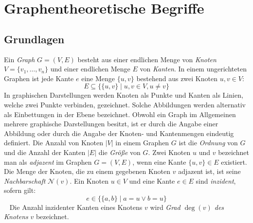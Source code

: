\section{Graphentheoretische Begriffe}
\vspace{-1mm}
\label{chap_prel}
\subsection{Grundlagen}
Ein \emph{Graph} $G = (V, E)$ besteht aus einer endlichen Menge von \emph{Knoten} $V = \{v_1 ,\ldots, v_n\}$ und einer endlichen Menge $E$ von \emph{Kanten}. In einem ungerichteten Graphen ist jede Kante $e$ eine Menge $\{u, v\}$ bestehend aus zwei Knoten $u, v \in V$:\vspace{-1mm}
$$E \subseteq \{\{u, v\}\; |\; u, v \in V, u \neq v\}$$
In graphischen Darstellungen werden Knoten als Punkte und Kanten als Linien, welche zwei Punkte verbinden, gezeichnet. Solche Abbildungen werden alternativ als Einbettungen in der Ebene bezeichnet. Obwohl ein Graph im Allgemeinen mehrere graphische Darstellungen besitzt, ist er durch die Angabe einer Abbildung oder durch die Angabe der Knoten- und Kantenmengen eindeutig definiert.\vspace{-1mm}\newline\newline
Die Anzahl von Knoten $|V|$ in einem Graphen $G$ ist die \emph{Ordnung} von $G$ und die Anzahl der Kanten $|E|$ die \emph{Größe} von $G$. Zwei Knoten $u$ und $v$ bezeichnet man als \emph{adjazent} im Graphen $G=(V,E)$, wenn eine Kante $\{u, v\} \in E$ existiert.\\Die Menge der Knoten, die zu einem gegebenen Knoten $v$ adjazent ist, ist seine \emph{Nachbarschaft} $\mathcal{N}(v)$. Ein Knoten $u \in V$ und eine Kante $e \in E$ sind \emph{inzident}, sofern gilt: \vspace{-1mm} $$e \in \{\{a,b\}\;|\;a=u \vee b=u\}$$ \vspace{-4mm}~\linebreak
Die Anzahl inzidenter Kanten eines Knotens $v$ wird \emph{Grad $\deg(v)$ des Knotens} $v$ bezeichnet.\\
\vspace{-8mm}
